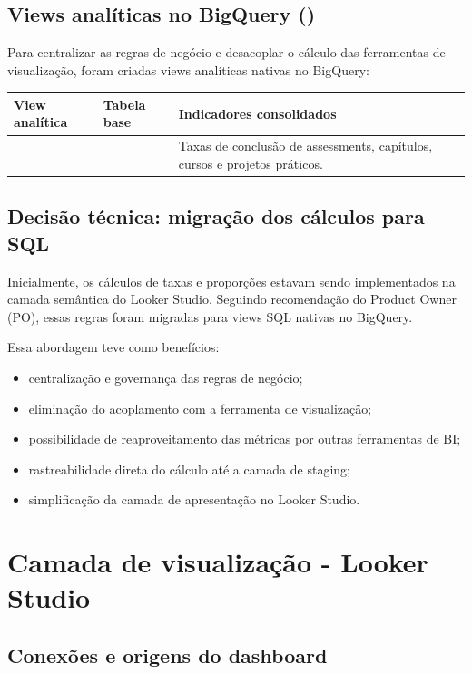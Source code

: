 \documentclass[11pt,a4paper]{article}
\begin{document}
\subsection{Views analíticas no BigQuery ()}

Para centralizar as regras de negócio e desacoplar o cálculo das ferramentas de
visualização, foram criadas views analíticas nativas no BigQuery:

\begin{longtable}{L{45mm}L{45mm}L{58mm}}
\toprule
\textbf{View analítica} & \textbf{Tabela base} & \textbf{Indicadores consolidados} \\
\midrule
\endhead
{} &  & Taxas de conclusão de assessments, capítulos, cursos e projetos práticos. \\
\bottomrule
\end{longtable}

\subsection{Decisão técnica: migração dos cálculos para SQL}

Inicialmente, os cálculos de taxas e proporções estavam sendo implementados na
camada semântica do Looker Studio. Seguindo recomendação do Product Owner (PO),
essas regras foram migradas para views SQL nativas no BigQuery.

Essa abordagem teve como benefícios:
\begin{itemize}
  \item centralização e governança das regras de negócio;
  \item eliminação do acoplamento com a ferramenta de visualização;
  \item possibilidade de reaproveitamento das métricas por outras ferramentas de BI;
  \item rastreabilidade direta do cálculo até a camada de staging;
  \item simplificação da camada de apresentação no Looker Studio.
\end{itemize}

\section{Camada de visualização - Looker Studio}

\subsection{Conexões e origens do dashboard}
\end{document}
